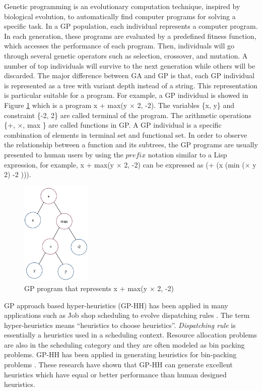 Genetic programming \cite{1992gppc.book.....K} is an evolutionary computation technique, inspired by biological evolution, to automatically find 
computer programs for solving a specific task. In a GP population, each individual represents a computer program. In each generation, these programs are evaluated by a predefined fitness function, which accesses the performance of each program. Then, individuals will go through several genetic operators such as selection, crossover, and mutation. A number of top individuals will survive to the next generation while others will be discarded. The major difference between GA and GP is that, each GP individual is represented as a tree with variant depth instead of a string. This representation is particular suitable for a program. For example,  a GP individual is showed in Figure \ref{fig:gp_program} which is a program x + max(y $\times$ 2, -2). The variables \{x, y\} and constraint \{-2, 2\} are called terminal of the program. The arithmetic operations \{+, $\times$, max \} are called functions in GP. A GP individual is a specific combination of elements in terminal set and functional set. In order to observe the relationship between a function and its subtrees, the GP programs are usually presented to human users by using the $prefix$ notation similar to a Lisp expression, for example, x + max(y $\times$ 2, -2) can be expressed as (+ (x (min ($\times$ y 2) -2 ))).

\begin{figure}
	\centering
	\includegraphics[width=0.3\textwidth]{pics/gp-tree.png}
	\caption{GP program that represents x + max(y $\times$ 2, -2)}
	\label{fig:gp_program}
\end{figure}


GP approach based hyper-heuristics (GP-HH)  has been applied in many applications such as Job shop scheduling to evolve dispatching rules \cite{Nguyen:2014eu}. The term hyper-heuristics \cite{Cowling:2000ek} means ``heuristics to choose heuristics''.
\emph{Dispatching rule} is essentially a heuristics \cite{Panwalkar:1977fw} used in a scheduling context. 
Resource allocation problems are also in the scheduling category and they are often modeled as bin packing problems. 
GP-HH has been applied in generating heuristics for bin-packing problems \cite{Poli:2007kt,Sim:2013fe,Burke:2012gs}. These research have shown that GP-HH can generate excellent heuristics which have equal or better performance than human designed heuristics.

